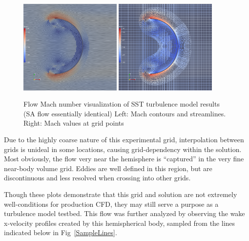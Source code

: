\documentclass[]{aiaa-tc}%
\begin{document}
\begin{figure}[htb!]
\begin{center}
\includegraphics[width=0.45\textwidth]{Images/sst_mach_lic.png}
\includegraphics[width=0.45\textwidth]{Images/sst_mach_wire.png}
\caption{Flow Mach number visualization of SST turbulence model results (SA flow essentially identical) Left: Mach contours and streamlines.  Right: Mach values at grid points}
\label{FlowVizClose}
\end{center}
\end{figure}



Due to the highly coarse nature of this experimental grid, interpolation between grids is unideal in some locations, causing grid-dependency within the solution.  Most obviously, the flow very near the hemisphere is ``captured'' in the very fine near-body volume grid.  Eddies are well defined in this region, but are discontinuous and less resolved when crossing into other grids.

Though these plots demonstrate that this grid and solution are not extremely well-conditions for production CFD, they may still serve a purpose as a turbulence model testbed.  This flow was further analyzed by observing the wake x-velocity profiles created by this hemispherical body, sampled from the lines indicated below in Fig~\ref{SampleLines}.
\end{document}
